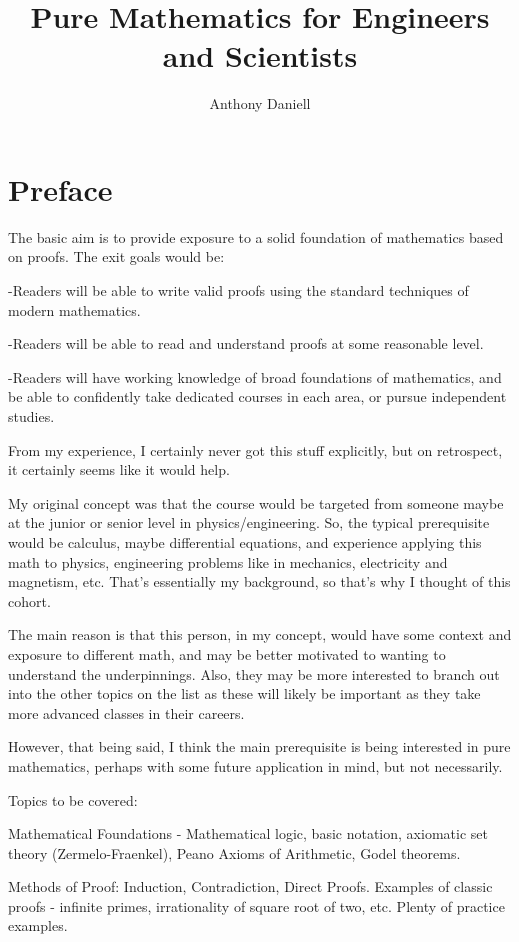 \documentclass{book}
\title{Pure Mathematics for Engineers and Scientists}
\author{Anthony Daniell}
\begin{document}
\maketitle 


\chapter*{Preface}


The basic aim is to provide exposure to a solid foundation of mathematics based on proofs.  The exit goals would be:

-Readers will be able to write valid proofs using the standard techniques of modern mathematics.

-Readers will be able to read and understand proofs at some reasonable level.

-Readers will have working knowledge of broad foundations of mathematics, and be able to confidently take dedicated courses in each area, or pursue independent studies.
    
    
From my experience, I certainly never got this stuff explicitly, but on retrospect, it certainly seems like it would help.     


My original concept was that the course would be targeted from someone maybe at the junior or senior level in physics/engineering.  So, the typical prerequisite would be calculus, maybe differential equations, and experience applying this math to physics, engineering problems like in mechanics, electricity and magnetism, etc.  That's essentially my background, so that's why I thought of this cohort.

The main reason is that this person, in my concept, would have some context and exposure to different math, and may be better motivated to wanting to understand the underpinnings.  Also, they may be more interested to branch out into the other topics on the list as these will likely be important as they take more advanced classes in their careers.

However, that being said, I think the main prerequisite is being interested in pure mathematics, perhaps with some future application in mind, but not necessarily.


Topics to be covered:

    Mathematical Foundations - Mathematical logic, basic notation, axiomatic set theory (Zermelo-Fraenkel), Peano Axioms of Arithmetic, Godel theorems.


    Methods of Proof:  Induction, Contradiction, Direct Proofs.  Examples of classic proofs - infinite primes, irrationality of square root of two, etc.  Plenty of practice examples.
\end{document}
